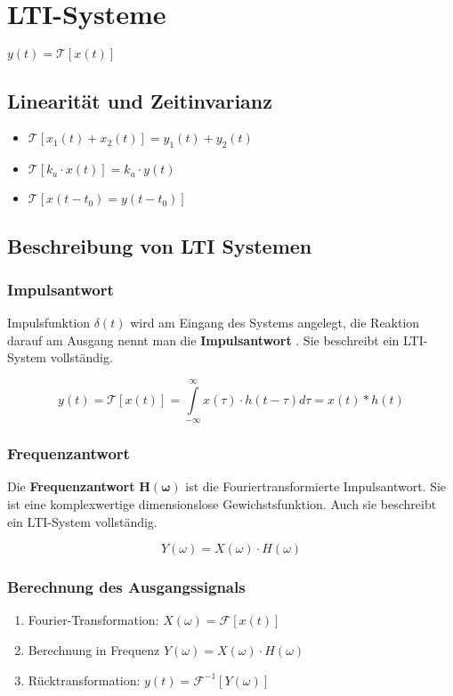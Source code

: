 \section{LTI-Systeme}

$ y(t) = \mathcal{T}[x(t)]$

\begin{multicols}{2}
    \subsection*{Linearität und Zeitinvarianz}
    \begin{itemize}
        \item $\mathcal{T}[x_1(t) + x_2(t)] = y_1(t) + y_2(t)$
        \item $\mathcal{T}[k_a \cdot x(t)] = k_a \cdot y(t)$
        \item $\mathcal{T}[x(t-t_0) = y(t-t_0)]$
    \end{itemize}

    \subsection{Beschreibung von LTI Systemen}

    \subsubsection{Impulsantwort}
    Impulsfunktion $\delta(t)$ wird am Eingang des Systems angelegt,
    die Reaktion darauf am Ausgang nennt man die \textbf{Impulsantwort} .
    Sie beschreibt ein LTI-System vollständig.

    $$ y(t) = \mathcal{T}[x(t)]
        = \int \limits _{-\infty} ^{\infty} x(\tau) \cdot h(t-\tau)d\tau
        = x(t) * h(t)$$
  
    \subsubsection{Frequenzantwort}
    Die \textbf{Frequenzantwort} $\bm{H(\omega)}$ ist die Fouriertransformierte Impulsantwort.
    Sie ist eine komplexwertige dimensionslose Gewichstsfunktion.
    Auch sie beschreibt ein LTI-System vollständig.

    $$ Y(\omega) = X(\omega) \cdot H(\omega)$$

    \subsubsection{Berechnung des Ausgangssignals}
\begin{enumerate}
   \item Fourier-Transformation:  $X(\omega) = \mathcal{F}[x(t)]$ 
   \item Berechnung in Frequenz  $Y(\omega) = X(\omega) \cdot H(\omega)$ 
   \item Rücktransformation:  $y(t) = \mathcal{F}^{-1}[Y(\omega)]$ 
\end{enumerate}



\end{multicols}

